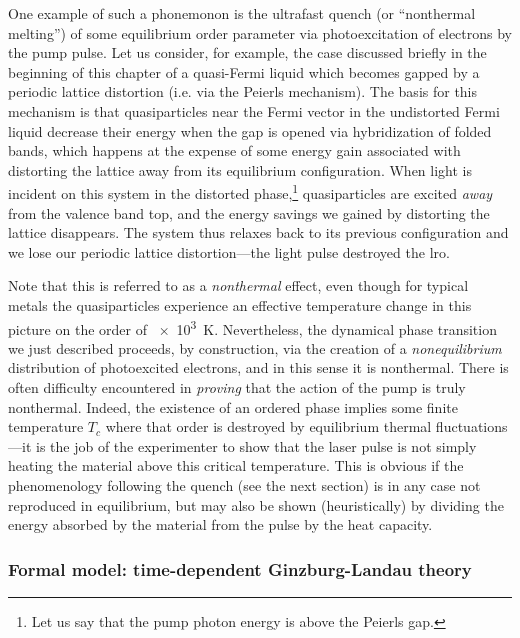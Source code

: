 One example of such a phonemonon is the ultrafast quench (or ``nonthermal melting'') of some equilibrium order parameter via photoexcitation of electrons by the pump pulse.
Let us consider, for example, the case discussed briefly in the beginning of this chapter of a quasi-\oned Fermi liquid which becomes gapped by a periodic lattice distortion (i.e. via the Peierls mechanism).
The basis for this mechanism is that quasiparticles near the Fermi vector in the undistorted Fermi liquid decrease their energy when the gap is opened via hybridization of folded bands, which happens at the expense of some energy gain associated with distorting the lattice away from its equilibrium configuration.
When light is incident on this system in the distorted phase,\footnote{Let us say that the pump photon energy is above the Peierls gap.} quasiparticles are excited \emph{away} from the valence band top, and the energy savings we gained by distorting the lattice disappears.
The system thus relaxes back to its previous configuration and we lose our periodic lattice distortion---the light pulse destroyed the \gls{lro}.

Note that this is referred to as a \emph{nonthermal} effect, even though for typical metals the quasiparticles experience an effective temperature change in this picture on the order of \qty{e3}{K}\citep{rethfeld_ultrafast_2002}.
Nevertheless, the dynamical phase transition we just described proceeds, by construction, via the creation of a \emph{nonequilibrium} distribution of photoexcited electrons, and in this sense it is nonthermal.
There is often difficulty encountered in \emph{proving} that the action of the pump is truly nonthermal.
Indeed, the existence of an ordered phase implies some finite temperature $T_c$ where that order is destroyed by equilibrium thermal fluctuations---it is the job of the experimenter to show that the laser pulse is not simply heating the material above this critical temperature.
This is obvious if the phenomenology following the quench (see the next section) is in any case not reproduced in equilibrium, but may also be shown (heuristically) by dividing the energy absorbed by the material from the pulse by the heat capacity.

\subsubsection{Formal model: time-dependent Ginzburg-Landau theory}

